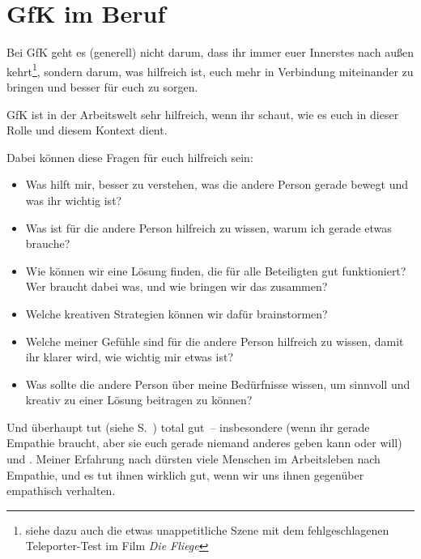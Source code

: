 \section{GfK im Beruf}
\label{gfk-im-beruf}

Bei GfK geht es (generell) nicht darum, dass ihr immer euer Innerstes nach außen kehrt\footnote{siehe dazu auch die etwas unappetitliche Szene mit dem fehlgeschlagenen Teleporter-Test im Film \emph{Die Fliege}}, sondern darum, was hilfreich ist, euch mehr in Verbindung miteinander zu bringen und besser für euch zu sorgen.

GfK ist in der Arbeitswelt sehr hilfreich, wenn ihr schaut, wie es euch in dieser Rolle und diesem Kontext dient.

Dabei können diese Fragen für euch hilfreich sein:

\begin{itemize}
  \item Was hilft mir, besser zu verstehen, was die andere Person gerade bewegt und was ihr wichtig ist?
  \item Was ist für die andere Person hilfreich zu wissen, warum ich gerade etwas brauche?
  \item Wie können wir eine Lösung finden, die für alle Beteiligten gut funktioniert? Wer braucht dabei was, und wie bringen wir das zusammen?
  \item Welche kreativen Strategien können wir dafür brainstormen?
  \item Welche meiner Gefühle sind für die andere Person hilfreich zu wissen, damit ihr klarer wird, wie wichtig mir etwas ist?
  \item Was sollte die andere Person über meine Bedürfnisse wissen, um sinnvoll und kreativ zu einer Lösung beitragen zu können?
\end{itemize}

Und überhaupt tut  (siehe S.~\pageref{empathie}) total gut~-- insbesondere  (wenn ihr gerade Empathie braucht, aber sie euch gerade niemand anderes geben kann oder will) und . Meiner Erfahrung nach dürsten viele Menschen im Arbeitsleben nach Empathie, und es tut ihnen wirklich gut, wenn wir uns ihnen gegenüber empathisch verhalten.
